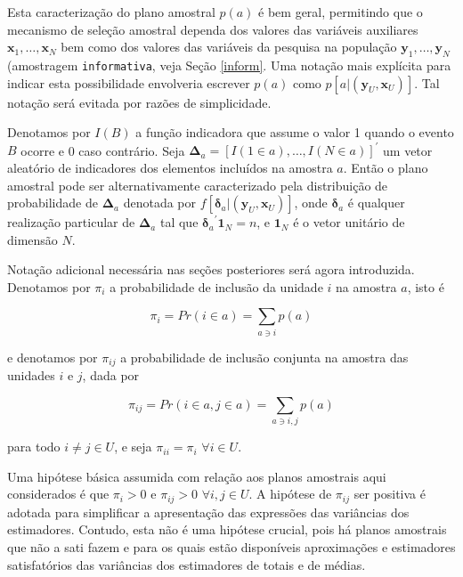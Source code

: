 \documentclass[]{book}
\numberwithin{example}{chapter}
\numberwithin{remark}{chapter}
\numberwithin{definition}{chapter}
\begin{document}
Esta caracterização do plano amostral \(p(a)\) é bem geral, permitindo
que o mecanismo de seleção amostral dependa dos valores das variáveis
auxiliares \(\mathbf{x}_1 ,\ldots, \mathbf{x}_N\) bem como dos valores
das variáveis da pesquisa na população
\(\mathbf{y}_1 ,\ldots, \mathbf{y}_N\) (amostragem \texttt{informativa},
veja Seção \ref{inform}. Uma notação mais explícita para indicar esta
possibilidade envolveria escrever \(p(a)\) como
\(p\left[ a | (\mathbf{y}_U , \mathbf{x}_U ) \right]\). Tal notação será
evitada por razões de simplicidade.

Denotamos por \(I(B)\) a função indicadora que assume o valor 1 quando o
evento \(B\) ocorre e 0 caso contrário. Seja
\(\mathbf{\Delta}_a = \left[ I(1 \in a) ,\ldots, I(N \in a)\right]^{\prime}\)
um vetor aleatório de indicadores dos elementos incluídos na amostra
\(a\). Então o plano amostral pode ser alternativamente caracterizado
pela distribuição de probabilidade de \(\mathbf{\Delta }_a\) denotada
por
\(f\left[ \mathbf{\delta }_a | \left(\mathbf{y}_U , \mathbf{x}_U \right) \right]\),
onde \(\mathbf{\delta }_a\) é qualquer realização particular de
\(\mathbf{\Delta }_a\) tal que
\({\mathbf{\delta}_a}^{\prime} \mathbf{1}_N = n\), e \(\mathbf{1}_N\) é
o vetor unitário de dimensão \(N\).

Notação adicional necessária nas seções posteriores será agora
introduzida. Denotamos por \(\pi_i\) a probabilidade de inclusão da
unidade \(i\) na amostra \(a\), isto é

\begin{equation}
\pi_i = Pr\left( i \in a \right) = \sum_{a \ni i} p(a)  \label{eq:ref5}
\end{equation}

e denotamos por \(\pi_{ij}\) a probabilidade de inclusão conjunta na
amostra das unidades \(i\) e \(j\), dada por

\begin{equation}
\pi_{ij} = Pr \left( i \in a , j \in a \right) = \sum_{a \ni i,j} p(a) \label{eq:ref6}
\end{equation}

para todo \(i \neq j \in U\), e seja \(\pi_{ii} = \pi_{i}\)
\(\forall i \in U.\)

Uma hipótese básica assumida com relação aos planos amostrais aqui
considerados é que \(\pi_i > 0\) e \(\pi_{ij} > 0\)
\(\forall i,j \in U.\) A hipótese de \(\pi_{ij}\) ser positiva é adotada
para simplificar a apresentação das expressões das variâncias dos
estimadores. Contudo, esta não é uma hipótese crucial, pois há planos
amostrais que não a sati fazem e para os quais estão disponíveis
aproximações e estimadores satisfatórios das variâncias dos estimadores
de totais e de médias.
\end{document}
